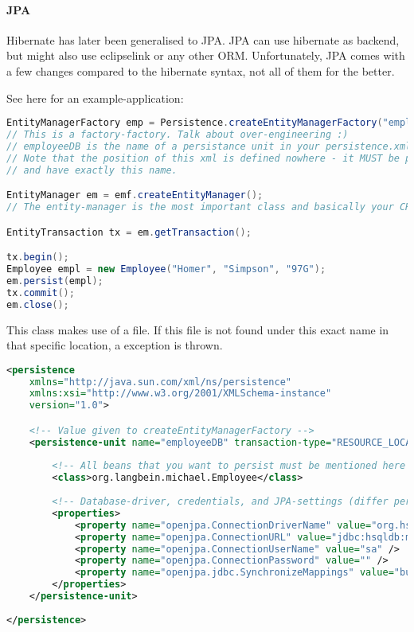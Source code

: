 \paragraph{JPA} Hibernate has later been generalised to JPA. JPA can use hibernate as backend, but might also use eclipselink or any other ORM. Unfortunately, JPA comes with a few changes compared to the hibernate syntax, not all of them for the better.

See here for an example-application: 

\begin{lstlisting}[language=java]
EntityManagerFactory emp = Persistence.createEntityManagerFactory("employeeDB"); 
// This is a factory-factory. Talk about over-engineering :)
// employeeDB is the name of a persistance unit in your persistence.xml. 
// Note that the position of this xml is defined nowhere - it MUST be placed in classroot/META-INF/persistence.xml
// and have exactly this name.

EntityManager em = emf.createEntityManager();
// The entity-manager is the most important class and basically your CRUD-Interface to the database.

EntityTransaction tx = em.getTransaction();

tx.begin();
Employee empl = new Employee("Homer", "Simpson", "97G");
em.persist(empl);
tx.commit();
em.close();
\end{lstlisting}

This class makes use of a  file. If this file is not found under this exact name in that specific location, a  exception is thrown. 

\begin{lstlisting}[language=xml]
<persistence 
    xmlns="http://java.sun.com/xml/ns/persistence"
    xmlns:xsi="http://www.w3.org/2001/XMLSchema-instance" 
    version="1.0">

    <!-- Value given to createEntityManagerFactory -->
    <persistence-unit name="employeeDB" transaction-type="RESOURCE_LOCAL">
    
        <!-- All beans that you want to persist must be mentioned here -->
        <class>org.langbein.michael.Employee</class>
        
        <!-- Database-driver, credentials, and JPA-settings (differ per vendor, but generally logging, create tables etc) -->
        <properties>
            <property name="openjpa.ConnectionDriverName" value="org.hsqldb.jdbcDriver" />
            <property name="openjpa.ConnectionURL" value="jdbc:hsqldb:mem:order" />
            <property name="openjpa.ConnectionUserName" value="sa" />
            <property name="openjpa.ConnectionPassword" value="" />
            <property name="openjpa.jdbc.SynchronizeMappings" value="buildSchema" />
        </properties>
    </persistence-unit>
    
</persistence>
\end{lstlisting}

